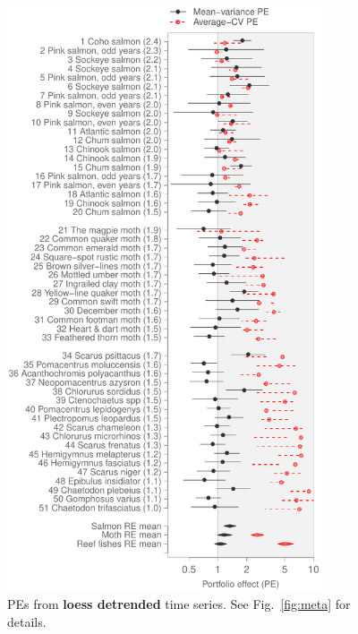 \begin{figure}[htbp]
  \centering
  \includegraphics[height=6.8in]{prophets/PE_comparison_z_meta_loess_detrend_taxa_20121214.pdf}
  \caption{PEs from \textbf{loess detrended} time series. See
    Fig.~\ref{fig:meta} for details.
}
\label{fig:meta-detrend-loess}
\end{figure}
\clearpage

